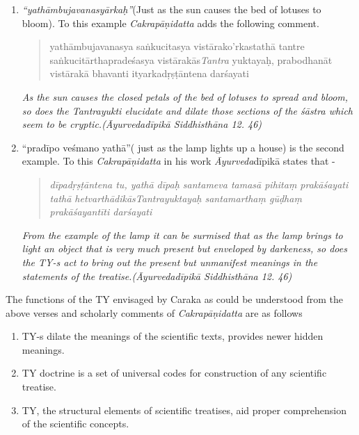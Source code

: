 \begin{enumerate}
\item 
 \textit{“yathāmbujavanasyārkaḥ”}(Just as the sun causes the bed of lotuses to bloom). To this example \textit{Cakrapāṇidatta} adds the following comment.

\begin{quote}
yathāmbujavanasya saṅkucitasya vistārako'rkastathā tantre saṅkucitārthapradeśasya vistārakās\textit{Tantra} yuktayaḥ, prabodhanāt vistārakā bhavanti ityarkadṛṣṭāntena darśayati
\end{quote}

\begin{myquote}
\textit{As the sun causes the closed petals of the bed of lotuses to spread and bloom, so does the Tantrayukti elucidate and dilate those sections of the śāstra which seem to be cryptic.}\hfill \textit{(Āyurvedadīpikā Siddhisthāna 12. 46)}
\end{myquote}


 \item 
 “pradīpo veśmano yathā”( just as the lamp lights up a house) is the second example. To this \textit{Cakrapāṇidatta} in his work \textit{Āyurveda}dīpikā states that -

\begin{quote}
\textit{dīpadṛṣṭāntena tu, yathā dīpaḥ santameva tamasā pihitaṃ prakāśayati tathā hetvarthādikāsTantrayuktayaḥ santa\-marthaṃ gūḍhaṃ prakāśayantīti darśayati}
\end{quote}

\begin{myquote}
\textit{From the example of the lamp it can be surmised that as the lamp brings to light an object that is very much present but enveloped by darkeness, so does the TY-s act to bring out the present but unmanifest meanings in the statements of the treatise.}\hfill \textit{(Āyurvedadīpikā Siddhisthāna 12. 46)}
\end{myquote}


\end{enumerate}

The functions of the TY envisaged by Caraka as could be understood from the above verses and scholarly comments of \textit{Cakrapāṇidatta} are as follows

\begin{enumerate}[{\rm a.}]
\itemsep=0pt
\item TY-s dilate the meanings of the scientific texts, provides newer hidden meanings.

 \item TY doctrine is a set of universal codes for construction of any scientific treatise.

 \item TY, the structural elements of scientific treatises, aid proper comprehension of the scientific concepts.

\end{enumerate}

